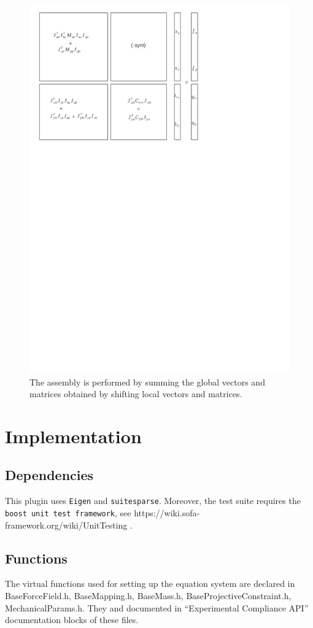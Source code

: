 \begin{figure}
\centering
 \includegraphics[clip,trim=5mm 185mm 70mm 5mm,width=0.6\linewidth]{system-assembly.pdf}
\caption{The assembly is performed by summing the global vectors and matrices obtained by shifting local vectors and matrices.}
\label{fig assembly}
\end{figure}


\section{Implementation} \label{sec implementation}

\subsection{Dependencies}
This plugin uses \texttt{Eigen} and \texttt{suitesparse}. Moreover, the test suite requires the \texttt{boost unit test framework}, see https://wiki.sofa-framework.org/wiki/UnitTesting  .

\subsection{Functions}

The virtual functions used for setting up the equation system are declared in BaseForceField.h, BaseMapping.h, BaseMass.h, BaseProjectiveConstraint.h, MechanicalParams.h.
They and documented in ``Experimental Compliance API'' documentation blocks of these files.


